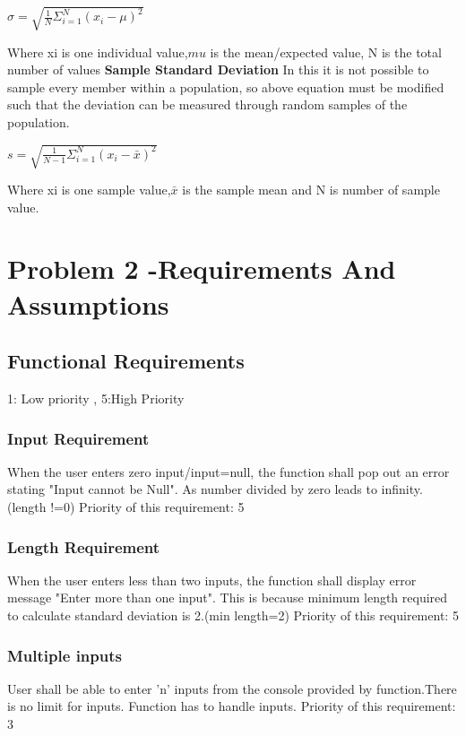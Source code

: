 \documentclass[a4paper,12pt]{article}
\begin{document}
\begin{titlepage}
\begin{center}
\begin{math}
\sigma=\sqrt{\frac{1}{N}\Sigma_{i=1}^{N}(x_{i}-\mu)^2}
\end{math}
\end{center}
Where xi is one individual value,$mu$ is the mean/expected value, N is the total number of values
\newline
\newline
\textbf{Sample Standard Deviation}
\newline
In this it is not possible to sample every member within a population, so above equation must be modified such that the deviation can be measured through random samples of the population. 
\begin{center}
\begin{math}
s= \sqrt{\frac{1}{N-1}\Sigma_{i=1}^{N}(x_{i}-\bar{x})^2}
\end{math}
\end{center}
Where xi is one sample value,$\bar{x}$ is the sample mean and N is number of sample value.

\section{Problem 2 -Requirements And Assumptions}
\subsection{Functional Requirements}
1: Low priority , 5:High Priority
\subsubsection{Input Requirement}
When the user enters zero input/input=null, the function shall pop out an error stating "Input cannot be Null". As number divided by zero leads to infinity. (length !=0)\newline
Priority of this requirement: 5
\subsubsection{Length Requirement}
When the user enters less than two inputs, the function shall display error message "Enter more than one input". This is because minimum length required to calculate standard deviation is 2.(min length=2)\newline
Priority of this requirement: 5
\subsubsection{Multiple inputs}
User shall be able to enter 'n' inputs from the console provided by function.There is no limit for inputs. Function has to handle inputs.\newline
Priority of this requirement: 3

\end{titlepage}
\end{document}
